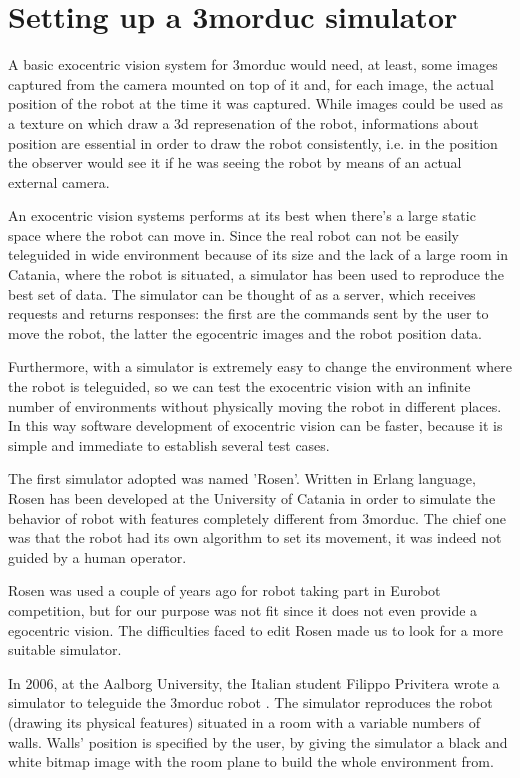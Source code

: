 \section{Setting up a 3morduc simulator}
\label{sec:simulator}
A basic exocentric vision system for 3morduc would need, 
at least, some images captured from the camera mounted 
on top of it and, for each image, the actual position of 
the robot at the time it was captured.
%
While images could be used as a texture on which draw 
a 3d represenation of the robot, informations about 
position are essential in order to draw the robot 
consistently, i.e. in the position the observer would 
see it if he was seeing the robot by means of an actual 
external camera.
%

%
An exocentric vision systems performs at its best 
when there's a large static space where the robot can move in. Since 
the real robot can not be easily teleguided in wide 
environment because of its size and the lack of a large 
room in Catania, where the robot is situated, a simulator 
has been used to reproduce the best set of data. The 
simulator can be thought of as a server, which receives 
requests and returns responses: the first are the commands 
sent by the user to move the robot, the latter the 
egocentric images and the robot position data.
%

%
Furthermore, with a simulator is extremely easy to 
change the environment where the robot is teleguided, 
so we can test the exocentric vision with an infinite 
number of environments without physically moving the 
robot in different places. In this way software 
development of exocentric vision can be faster, because 
it is simple and immediate to establish several test cases.
%

%
The first simulator adopted was named 'Rosen'. Written in 
Erlang language, Rosen has been developed at the University
of Catania in order to simulate the behavior of robot with 
features completely different from 3morduc. The chief one 
was that the robot had its own algorithm to set its movement, 
it was indeed not guided by a human operator. 
%

%
Rosen was used a couple of years ago for robot taking part 
in Eurobot competition, but for our purpose was not fit 
since it does not even provide a egocentric vision. The 
difficulties faced to edit Rosen made us to look for a more suitable
simulator.
%

%
In 2006, at the Aalborg University, the Italian student Filippo 
Privitera wrote a simulator to teleguide the 3morduc robot 
\cite{privitera}. The simulator reproduces the robot (drawing its 
physical features) situated in a room with a variable numbers 
of walls. Walls' position is specified by the user, by giving 
the simulator a black and white bitmap image with the room 
plane to build the whole environment from. 
%

